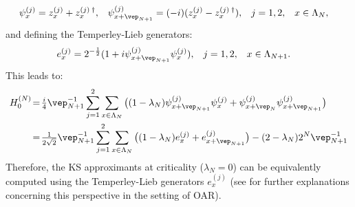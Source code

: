 \documentclass[a4paper, 11pt]{article}
\DeclareMathOperator{\1}{\mathds{1}}
\begin{document}
\begin{align}
\label{eq:majising}
\psi^{(j)}_{x} & = z^{(j)}_{x}+z^{(j)\!\ \dag}_{x}, & \psi^{(j)}_{x+\vep_{N+1}} & = (-i)(z^{(j)}_{x}-z^{(j)\!\ \dag}_{x}), & j & = 1,2, & x & \in\Lambda_{N},
\end{align}
and defining the Temperley-Lieb generators:
\begin{align}
\label{eq:tlgen}
e^{(j)}_{x} & = 2^{-\frac{1}{2}}(1+i\psi^{(j)}_{x+\vep_{N+1}}\psi^{(j)}_{x}), & j & = 1,2, & x & \in\Lambda_{N+1}.
\end{align}
This leads to:
\begin{align}
\label{eq:isingham3}
H^{(N)}_{0} & \!=\! \tfrac{i}{4}\vep_{N+1}^{-1}\sum_{j=1}^{2}\sum_{x\in\Lambda_{N}}\big((1-\lambda_{N})\psi^{(j)}_{x+\vep_{N+1}}\psi^{(j)}_{x}+\psi^{(j)}_{x+\vep_{N}}\psi^{(j)}_{x+\vep_{N+1}}\big) \\ \nonumber
& \!=\! \tfrac{1}{2\sqrt{2}}\vep_{N+1}^{-1}\sum_{j=1}^{2}\sum_{x\in\Lambda_{N}}\big((1-\lambda_{N})e^{(j)}_{x} + e^{(j)}_{x+\vep_{N+1}}\big) - (2-\lambda_{N})2^{N}\vep_{N+1}^{-1}
\end{align}
Therefore, the KS approximants at criticality ($\lambda_{N}=0$) can be equivalently computed using the Temperley-Lieb generators $e^{(j)}_{x}$ (see \cite{StottmeisterAnyonBraidingAnd} for further explanations concerning this perspective in the setting of OAR).
\end{document}
